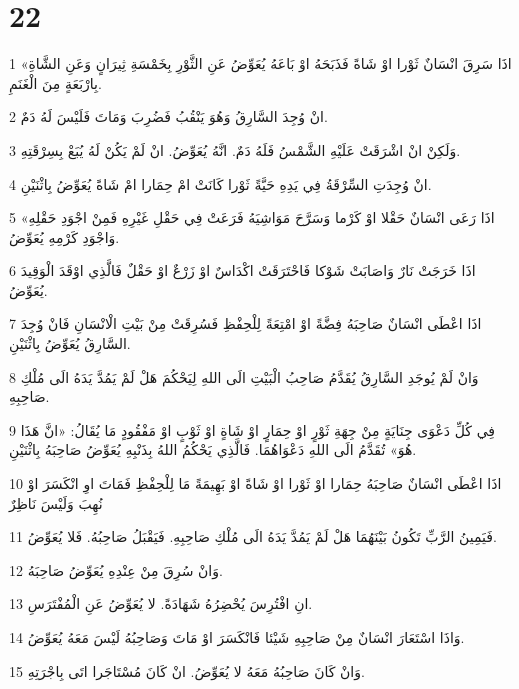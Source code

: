 \chapter{22}

\par 1 «اذَا سَرِقَ انْسَانٌ ثَوْرا اوْ شَاةً فَذَبَحَهُ اوْ بَاعَهُ يُعَوِّضُ عَنِ الثَّوْرِ بِخَمْسَةِ ثِيرَانٍ وَعَنِ الشَّاةِ بِارْبَعَةٍ مِنَ الْغَنَمِ.
\par 2 انْ وُجِدَ السَّارِقُ وَهُوَ يَنْقُبُ فَضُرِبَ وَمَاتَ فَلَيْسَ لَهُ دَمٌ.
\par 3 وَلَكِنْ انْ اشْرَقَتْ عَلَيْهِ الشَّمْسُ فَلَهُ دَمٌ. انَّهُ يُعَوِّضُ. انْ لَمْ يَكُنْ لَهُ يُبَعْ بِسِرْقَتِهِ.
\par 4 انْ وُجِدَتِ السِّرْقَةُ فِي يَدِهِ حَيَّةً ثَوْرا كَانَتْ امْ حِمَارا امْ شَاةً يُعَوِّضُ بِاثْنَيْنِ.
\par 5 «اذَا رَعَى انْسَانٌ حَقْلا اوْ كَرْما وَسَرَّحَ مَوَاشِيَهُ فَرَعَتْ فِي حَقْلِ غَيْرِهِ فَمِنْ اجْوَدِ حَقْلِهِ وَاجْوَدِ كَرْمِهِ يُعَوِّضُ.
\par 6 اذَا خَرَجَتْ نَارٌ وَاصَابَتْ شَوْكا فَاحْتَرَقَتْ اكْدَاسٌ اوْ زَرْعٌ اوْ حَقْلٌ فَالَّذِي اوْقَدَ الْوَقِيدَ يُعَوِّضُ.
\par 7 اذَا اعْطَى انْسَانٌ صَاحِبَهُ فِضَّةً اوْ امْتِعَةً لِلْحِفْظِ فَسُرِقَتْ مِنْ بَيْتِ الْانْسَانِ فَانْ وُجِدَ السَّارِقُ يُعَوِّضُ بِاثْنَيْنِ.
\par 8 وَانْ لَمْ يُوجَدِ السَّارِقُ يُقَدَّمُ صَاحِبُ الْبَيْتِ الَى اللهِ لِيَحْكُمَ هَلْ لَمْ يَمُدَّ يَدَهُ الَى مُلْكِ صَاحِبِهِ.
\par 9 فِي كُلِّ دَعْوَى جِنَايَةٍ مِنْ جِهَةِ ثَوْرٍ اوْ حِمَارٍ اوْ شَاةٍ اوْ ثَوْبٍ اوْ مَفْقُودٍ مَا يُقَالُ: «انَّ هَذَا هُوَ» تُقَدَّمُ الَى اللهِ دَعْوَاهُمَا. فَالَّذِي يَحْكُمُ اللهُ بِذَنْبِهِ يُعَوِّضُ صَاحِبَهُ بِاثْنَيْنِ.
\par 10 اذَا اعْطَى انْسَانٌ صَاحِبَهُ حِمَارا اوْ ثَوْرا اوْ شَاةً اوْ بَهِيمَةً مَا لِلْحِفْظِ فَمَاتَ اوِ انْكَسَرَ اوْ نُهِبَ وَلَيْسَ نَاظِرٌ
\par 11 فَيَمِينُ الرَّبِّ تَكُونُ بَيْنَهُمَا هَلْ لَمْ يَمُدَّ يَدَهُ الَى مُلْكِ صَاحِبِهِ. فَيَقْبَلُ صَاحِبُهُ. فَلا يُعَوِّضُ.
\par 12 وَانْ سُرِقَ مِنْ عِنْدِهِ يُعَوِّضُ صَاحِبَهُ.
\par 13 انِ افْتُرِسَ يُحْضِرُهُ شَهَادَةً. لا يُعَوِّضُ عَنِ الْمُفْتَرَسِ.
\par 14 وَاذَا اسْتَعَارَ انْسَانٌ مِنْ صَاحِبِهِ شَيْئا فَانْكَسَرَ اوْ مَاتَ وَصَاحِبُهُ لَيْسَ مَعَهُ يُعَوِّضُ.
\par 15 وَانْ كَانَ صَاحِبُهُ مَعَهُ لا يُعَوِّضُ. انْ كَانَ مُسْتَاجَرا اتَى بِاجْرَتِهِ.
